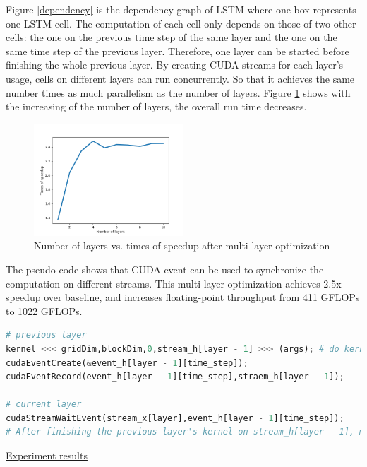 \documentclass{article}
\begin{document}
Figure \ref{dependency} is the dependency graph of LSTM where one box represents one LSTM cell. The computation of each cell only depends on those of two other cells: the one on the previous time step of the same layer and the one on the same time step of the previous layer. Therefore, one layer can be started before finishing the whole previous layer. By creating CUDA streams for each layer's usage, cells on different layers can run concurrently. So that it achieves the same number times as much parallelism as the number of layers. Figure \ref{opt5} shows with the increasing of the number of layers, the overall run time decreases. 

\begin{figure}[H]
\centering
\includegraphics[width=0.5\textwidth]{opt5}
\caption{Number of layers vs. times of speedup after multi-layer optimization}
\label{opt5}
\end{figure}

The pseudo code shows that CUDA event can be used to synchronize the computation on different streams. This multi-layer optimization achieves 2.5x speedup over baseline, and increases floating-point throughput from 411 GFLOPs to 1022 GFLOPs.

\begin{lstlisting}[language=Python, caption=Pseudo code of using event to synchronize multi-layers]
# previous layer
kernel <<< gridDim,blockDim,0,stream_h[layer - 1] >>> (args); # do kernel on stream_h[layer - 1]
cudaEventCreate(&event_h[layer - 1][time_step]);
cudaEventRecord(event_h[layer - 1][time_step],straem_h[layer - 1]);

# current layer
cudaStreamWaitEvent(stream_x[layer],event_h[layer - 1][time_step]);
# After finishing the previous layer's kernel on stream_h[layer - 1], matrix multiplication of input x on the current layer will proceed on stream_x[layer]
\end{lstlisting}

\underline{\large{Experiment results}}
\end{document}

